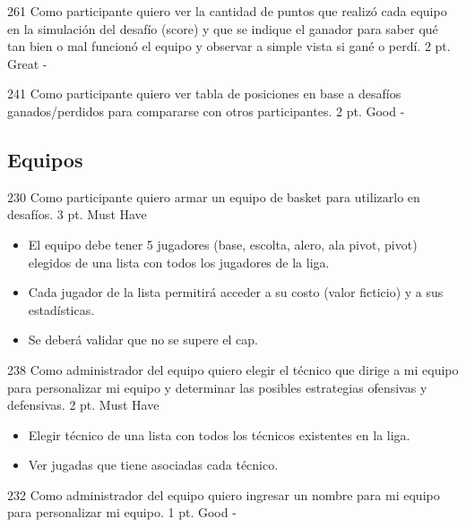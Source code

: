 \simplestory
{261}
{Como participante quiero ver la cantidad de puntos que realizó cada equipo en la simulación del desafío (score) y que se indique el ganador para saber qué tan bien o mal funcionó el equipo y observar a simple vista si gané o perdí.
}
{2 pt.}
{Great}
{-}

\vspace{1cm}

\simplestory
{241}
{Como participante quiero ver tabla de posiciones en base a desafíos ganados/perdidos para compararse con otros participantes.}
{2 pt.}
{Good}
{-}

\vspace{1cm}



\subsection{Equipos}

\simplestory
{230}
{Como participante quiero armar un equipo de basket para utilizarlo en desafíos.}
{3 pt.}
{Must Have}
{\begin{itemize}
\item El equipo debe tener 5 jugadores (base, escolta, alero, ala pivot, pivot) elegidos de una lista con todos los jugadores de la liga.
\item Cada jugador de la lista permitirá acceder a su costo (valor ficticio) y a sus estadísticas.
\item Se deberá validar que no se supere el cap.
\end{itemize}}

\vspace{1cm}

\simplestory
{238}
{Como administrador del equipo quiero elegir el técnico que dirige a mi equipo para personalizar mi equipo y determinar las posibles estrategias ofensivas y defensivas.}
{2 pt.}
{Must Have}
{\begin{itemize}
\item Elegir técnico de una lista con todos los técnicos existentes en la liga.
\item Ver jugadas que tiene asociadas cada técnico.
\end{itemize}}

\vspace{1cm}

\simplestory
{232}
{Como administrador del equipo quiero ingresar un nombre para mi equipo para personalizar mi equipo.}
{1 pt.}
{Good}
{-}

